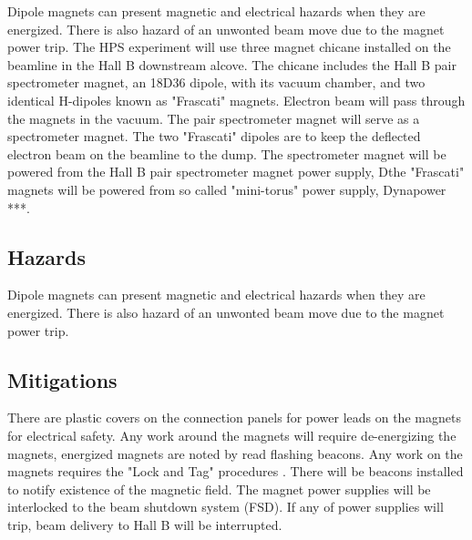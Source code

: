 
Dipole magnets can present magnetic and electrical hazards when they are energized. There is also hazard of an unwonted beam move due to the magnet power trip.  
The HPS experiment will use three magnet chicane installed on the beamline in the Hall B downstream alcove. The chicane includes the Hall B pair spectrometer magnet, an 18D36 dipole, with its vacuum chamber, and two identical H-dipoles known as "Frascati" magnets. Electron beam will pass through the magnets in the vacuum. The pair spectrometer magnet will serve as a spectrometer magnet. The two "Frascati" dipoles are to keep the deflected electron beam on the beamline to the dump. The spectrometer magnet will be powered from the Hall B pair spectrometer magnet power supply, Dthe "Frascati" magnets will be powered from so called "mini-torus" power supply, Dynapower ***.   

\subsection{Hazards} 
\indent

Dipole magnets can present magnetic and electrical hazards when they are energized. There is also hazard of an unwonted beam move due to the magnet power trip.  



\subsection{Mitigations}
\indent

There are plastic covers on the connection panels for power leads on the magnets for electrical safety. Any work around the magnets will require de-energizing the magnets, energized magnets are noted by read flashing beacons. Any work on the magnets requires the "Lock and Tag" procedures \cite{ehs}. There will be beacons installed to notify existence of the magnetic field. The magnet power supplies will be interlocked to the beam shutdown system (FSD). If any of power supplies will trip, beam delivery to Hall B will be interrupted.

